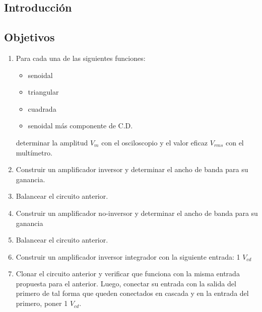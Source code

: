 \documentclass[DIV=calc, paper=a4, fontsize=11pt]{scrartcl}
\begin{document}
\begin{multicols}{2}




\section*{Introducción}

\subsection*{Objetivos}

\begin{enumerate}
    \item Para cada una de las siguientes funciones:
    \begin{itemize}
        \item senoidal
        
        \item triangular
        
        \item cuadrada
        
        \item senoidal más componente de C.D.
    \end{itemize}
    
    determinar la amplitud $V_m$ con el osciloscopio y el valor eficaz $V_{rms}$ con el multímetro.
    
    \item Construir un amplificador inversor y determinar el ancho de banda para su ganancia. 
    
    \item Balancear el circuito anterior.
    
    \item Construir un amplificador no-inversor y determinar el ancho de banda para su ganancia 
    
    \item Balancear el circuito anterior.
    
    \item Construir un amplificador inversor integrador con la siguiente entrada: 1 $V_{cd}$
    
    \item Clonar el circuito anterior y verificar que funciona con la misma entrada propuesta para el anterior. Luego, conectar su entrada con la salida del primero de tal forma que queden conectados en cascada y en la entrada del primero, poner 1 $V_{cd}$.
\end{enumerate}


\end{multicols}
\end{document}
